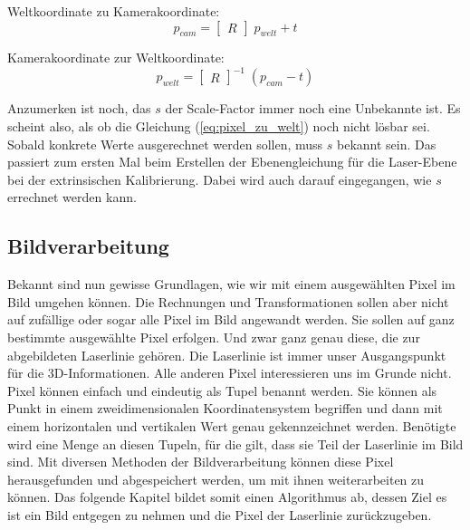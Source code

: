 	Weltkoordinate zu Kamerakoordinate:
	\begin{equation}
	p_{cam} = \begin{bmatrix} R \end{bmatrix} \; p_{welt} + t
	\label{eq:welt_zu_kamera}
	\end{equation}
	
	Kamerakoordinate zur Weltkoordinate:
	\begin{equation}
	p_{welt} = \begin{bmatrix} R \end{bmatrix}^{-1} \; (p_{cam} - t)
	\label{eq:kamera_zu_welt}
	\end{equation}
	
	Anzumerken ist noch, das \( s \) der Scale-Factor immer noch eine Unbekannte ist. Es scheint also, als ob die Gleichung (\ref{eq:pixel_zu_welt}) noch nicht lösbar sei. Sobald konkrete Werte ausgerechnet werden sollen, muss \( s \) bekannt sein. Das passiert zum ersten Mal beim Erstellen der Ebenengleichung für die Laser-Ebene bei der extrinsischen Kalibrierung. Dabei wird auch darauf eingegangen, wie \( s \) errechnet werden kann.  
	
	\newpage
	
	\label{chap:transformationen}
	\subsection{Bildverarbeitung}
	Bekannt sind nun gewisse Grundlagen, wie wir mit einem ausgewählten Pixel im Bild umgehen können. Die Rechnungen und Transformationen sollen aber nicht auf zufällige oder sogar alle Pixel im Bild angewandt werden. Sie sollen auf ganz bestimmte ausgewählte Pixel erfolgen. Und zwar ganz genau diese, die zur abgebildeten Laserlinie gehören. Die Laserlinie ist immer unser Ausgangspunkt für die 3D-Informationen. Alle anderen Pixel interessieren uns im Grunde nicht. \newline
	Pixel können einfach und eindeutig als Tupel benannt werden. Sie können als Punkt in einem zweidimensionalen Koordinatensystem begriffen und dann mit einem horizontalen und vertikalen Wert genau gekennzeichnet werden. Benötigte wird eine Menge an diesen Tupeln, für die gilt, dass sie Teil der Laserlinie im Bild sind. Mit diversen Methoden der Bildverarbeitung können diese Pixel herausgefunden und abgespeichert werden, um mit ihnen weiterarbeiten zu können. Das folgende Kapitel bildet somit einen Algorithmus ab, dessen Ziel es ist ein Bild entgegen zu nehmen und die Pixel der Laserlinie zurückzugeben. 
	
